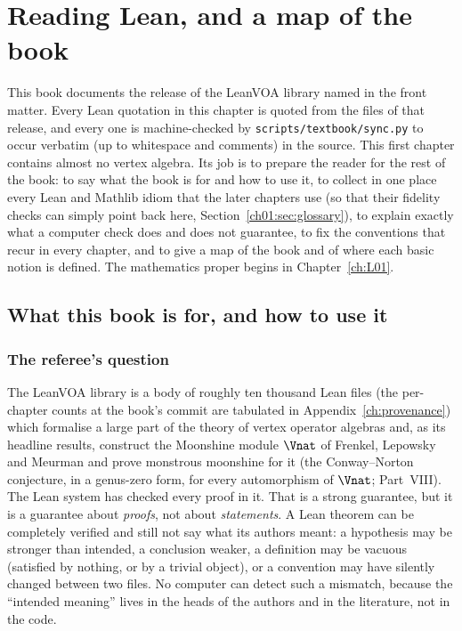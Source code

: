 \chapter{Reading Lean, and a map of the book}\label{ch:01}
\begingroup\setlength{\emergencystretch}{3em}

\providecommand{\chonevac}{\mathbf{1}}
\providecommand{\choneV}{\mathcal{V}}

This book documents the release of the LeanVOA library named in the front matter. Every Lean quotation in this chapter is quoted from the files of that
release, and every one is machine-checked by \texttt{scripts/textbook/sync.py} to occur verbatim
(up to whitespace and comments) in the source. This first chapter contains almost no vertex
algebra. Its job is to prepare the reader for the rest of the book: to say what the book is for
and how to use it, to collect in one place every Lean and Mathlib idiom that the later chapters use
(so that their fidelity checks can simply point back here, Section~\ref{ch01:sec:glossary}), to explain exactly what a computer
check does and does not guarantee, to fix the conventions that recur in every chapter, and to give a
map of the book and of where each basic notion is defined. The mathematics proper begins in
Chapter~\ref{ch:L01}.

\section{What this book is for, and how to use it}\label{ch01:sec:purpose}

\subsection{The referee's question}

The LeanVOA library is a body of roughly ten thousand Lean files (the per-chapter counts at the book's commit are tabulated in
Appendix~\ref{ch:provenance})
which formalise a large part of the theory of vertex operator algebras and, as its headline results,
construct the Moonshine module $\Vnat$ of Frenkel, Lepowsky and Meurman and prove monstrous moonshine for it (the
Conway--Norton conjecture, in a genus-zero form, for every automorphism of $\Vnat$; Part~VIII). The Lean system has checked
every proof in it. That is a strong guarantee, but it is a guarantee about \emph{proofs}, not about
\emph{statements}. A Lean theorem can be completely verified and still not say what its authors
meant: a hypothesis may be stronger than intended, a conclusion weaker, a definition may be vacuous
(satisfied by nothing, or by a trivial object), or a convention may have silently changed between
two files. No computer can detect such a mismatch, because the ``intended meaning'' lives in the
heads of the authors and in the literature, not in the code.

